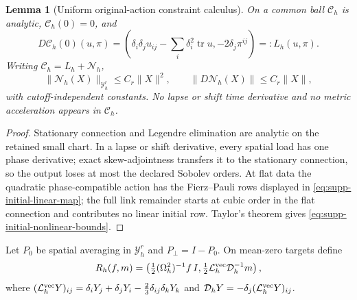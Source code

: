\documentclass[11pt]{article}
\newtheorem{lemma}[lemma]{Lemma}
\theoremstyle{definition}
\theoremstyle{remark}
\newcommand{\tr}{\operatorname{tr}}
\begin{document}
\begin{lemma}[Uniform original-action constraint calculus]
\label{lem:supp-initial-calculus}
On a common ball $\mathscr C_h$ is analytic, $\mathscr C_h(0)=0$, and
\begin{equation}
 D\mathscr C_h(0)(u,\pi)=
 \left(\delta_i\delta_j u_{ij}-\sum_i\delta_i^2\tr u,
                         -2\delta_j\pi^{ij}\right)=:L_h(u,\pi).
 \label{eq:supp-initial-linear-map}
\end{equation}
Writing $\mathscr C_h=L_h+\mathscr N_h$,
\begin{equation}
 \|\mathscr N_h(X)\|_{\mathcal Y_h^r}\le C_r\|X\|^2,
 \qquad \|D\mathscr N_h(X)\|\le C_r\|X\|,
 \label{eq:supp-initial-nonlinear-bounds}
\end{equation}
with cutoff-independent constants.  No lapse or shift time derivative and no
metric acceleration appears in $\mathscr C_h$.
\end{lemma}
\begin{proof}
Stationary connection and Legendre elimination are analytic on the retained
small chart.  In a lapse or shift derivative, every spatial load has one phase
derivative; exact skew-adjointness transfers it to the stationary connection,
so the output loses at most the declared Sobolev orders.  At flat data the
quadratic phase-compatible action has the Fierz--Pauli rows displayed in
\eqref{eq:supp-initial-linear-map}; the full link remainder starts at cubic
order in the flat connection and contributes no linear initial row.  Taylor's
theorem gives \eqref{eq:supp-initial-nonlinear-bounds}.
\end{proof}

Let $P_0$ be spatial averaging in $\mathcal Y_h^r$ and
$P_\perp=I-P_0$.  On mean-zero targets define
\begin{equation}
 R_h(f,m)=\left(\tfrac12(\Omega_h^2)^{-1}f\,I,
  \tfrac12\mathcal L_h^{\rm vec}\mathcal D_h^{-1}m\right),
 \label{eq:supp-initial-right-inverse}
\end{equation}
where
$(\mathcal L_h^{\rm vec}Y)_{ij}=\delta_iY_j+\delta_jY_i
 -\frac23\delta_{ij}\delta_kY_k$ and
$\mathcal D_hY=-\delta_j(\mathcal L_h^{\rm vec}Y)_{ij}$.
\end{document}

